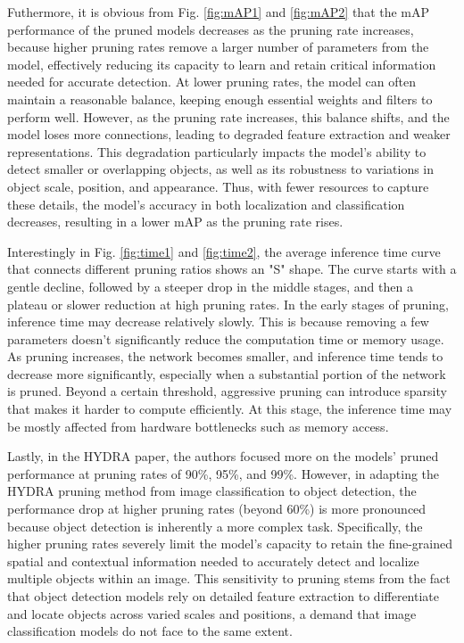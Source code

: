 \documentclass[journal,onecolumn,12pt]{IEEEtran}
\begin{document}
Futhermore, it is obvious from Fig. \ref{fig:mAP1} and \ref{fig:mAP2} that the mAP performance of the pruned models decreases as the pruning rate increases, because higher pruning rates remove a larger number of parameters from the model, effectively reducing its capacity to learn and retain critical information needed for accurate detection. At lower pruning rates, the model can often maintain a reasonable balance, keeping enough essential weights and filters to perform well. However, as the pruning rate increases, this balance shifts, and the model loses more connections, leading to degraded feature extraction and weaker representations. This degradation particularly impacts the model’s ability to detect smaller or overlapping objects, as well as its robustness to variations in object scale, position, and appearance. Thus, with fewer resources to capture these details, the model’s accuracy in both localization and classification decreases, resulting in a lower mAP as the pruning rate rises.

Interestingly in Fig. \ref{fig:time1} and \ref{fig:time2}, the average inference time curve that connects different pruning ratios shows an "S" shape. The curve starts with a gentle decline, followed by a steeper drop in the middle stages, and then a plateau or slower reduction at high pruning rates. In the early stages of pruning, inference time may decrease relatively slowly. This is because removing a few parameters doesn't significantly reduce the computation time or memory usage. As pruning increases, the network becomes smaller, and inference time tends to decrease more significantly, especially when a substantial portion of the network is pruned. Beyond a certain threshold, aggressive pruning can introduce sparsity that makes it harder to compute efficiently. At this stage, the inference time may be mostly affected from hardware bottlenecks such as memory access.

Lastly, in the HYDRA paper, the authors focused more on the models' pruned performance at pruning rates of 90\%, 95\%, and 99\%. However, in adapting the HYDRA pruning method from image classification to object detection, the performance drop at higher pruning rates (beyond 60\%) is more pronounced because object detection is inherently a more complex task. Specifically, the higher pruning rates severely limit the model's capacity to retain the fine-grained spatial and contextual information needed to accurately detect and localize multiple objects within an image. This sensitivity to pruning stems from the fact that object detection models rely on detailed feature extraction to differentiate and locate objects across varied scales and positions, a demand that image classification models do not face to the same extent. 
\end{document}
